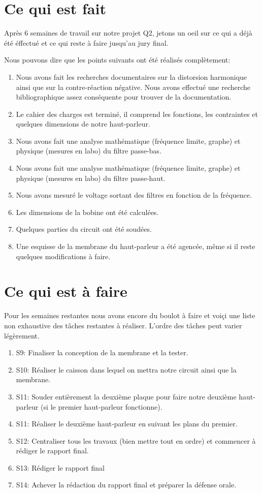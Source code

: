 

\section{Ce qui est fait}
Après 6 semaines de travail sur notre projet Q2, jetons un oeil sur ce qui a déjà été éffectué et ce qui reste à faire jusqu'au jury final.

Nous pouvons dire que les points suivants ont été réalisés complètement:
\\
\begin{enumerate}
\item Nous avons fait les recherches documentaires sur la distorsion harmonique ainsi que sur la contre-réaction négative.
Nous avons effectué une recherche bibliographique assez conséquente pour trouver de la documentation.
\item Le cahier des charges est terminé, il comprend les fonctions, les contraintes et quelques dimensions de notre haut-parleur.
\item Nous avons fait une analyse mathématique (fréquence limite, graphe) et physique (mesures en labo) du filtre passe-bas. 
\item Nous avons fait une analyse mathématique (fréquence limite, graphe) et physique (mesures en labo) du filtre passe-haut.
\item Nous avons mesuré le voltage sortant des filtres en fonction de la fréquence.
\item Les dimensions de la bobine ont été calculées.
\item Quelques parties du circuit ont été soudées.
\item Une esquisse de la membrane du haut-parleur a été agencée, même si il reste quelques modifications à faire.
\end{enumerate}

\section{Ce qui est à faire}

Pour les semaines restantes nous avons encore du boulot à faire et voiçi une liste non exhaustive des tâches restantes à réaliser.
L'ordre des tâches peut varier légèrement.
\begin{enumerate}

\item{S9}: Finaliser la conception de la membrane et la tester.
\item{S10}: Réaliser le caisson dans lequel on mettra notre circuit ainsi que la membrane.
\item{S11}: Souder entièrement la deuxième plaque pour faire notre deuxième haut-parleur (si le premier haut-parleur fonctionne).
\item{S11}: Réaliser le deuxième haut-parleur en suivant les plans du premier.
\item{S12}: Centraliser tous les travaux (bien mettre tout en ordre) et commencer à rédiger le rapport final.
\item{S13}: Rédiger le rapport final
\item{S14}: Achever la rédaction du rapport final et préparer la défense orale.
\end{enumerate}

